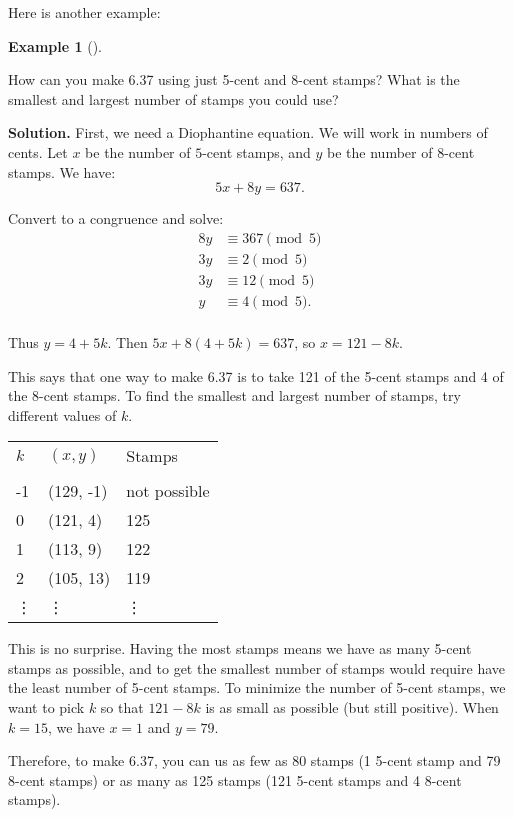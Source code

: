 \documentclass[10pt,]{book}
\theoremstyle{plain}
\theoremstyle{definition}
\newtheorem{example}[theorem]{Example}
\theoremstyle{definition}
\theoremstyle{definition}
\numberwithin{equation}{chapter}
\newcommand{\hrulethin}  {\noalign{\hrule height 0.04em}}
\newcommand{\amp}{ & }
\begin{document}
Here is another example:
%
\begin{example}[]\label{example-121}

How can you make \textdollar{}6.37 using just 5-cent and 8-cent stamps? What is the smallest and largest number of stamps you could use?
%
\par\medskip\noindent%
\textbf{Solution.}\quad
First, we need a Diophantine equation. We will work in numbers of cents. Let \(x\) be the number of \(5\)-cent stamps, and \(y\) be the number of 8-cent stamps. We have:
\begin{equation*}
  5x + 8y = 637.
\end{equation*}
%
\par

Convert to a congruence and solve:
\begin{equation*}
  \begin{aligned}8y \amp  \equiv 367 \pmod{5}\\
				3y \amp  \equiv 2 \pmod 5\\
				3y \amp  \equiv 12 \pmod 5\\
				y \amp  \equiv 4 \pmod 5.\\
\end{aligned}
\end{equation*}
%
\par

Thus \(y = 4 + 5k\). Then \(5x + 8(4+5k) = 637\), so \(x = 121 - 8k\).
%
\par

This says that one way to make \textdollar{}6.37 is to take 121 of the 5-cent stamps and 4 of the 8-cent stamps. To find the smallest and largest number of stamps, try different values of \(k\).
%
\begin{tabular}{lll}
\(k\)&\((x,y)\)&Stamps\tabularnewline[0pt]
&&\tabularnewline\hrulethin
-1&(129, -1)&not possible\tabularnewline[0pt]
0&(121, 4)&125\tabularnewline[0pt]
1&(113, 9)&122\tabularnewline[0pt]
2&(105, 13)&119\tabularnewline[0pt]
\vdots&\vdots&\vdots
\end{tabular}
\par

This is no surprise. Having the most stamps means we have as many 5-cent stamps as possible, and to get the smallest number of stamps would require have the least number of 5-cent stamps. To minimize the number of 5-cent stamps, we want to pick \(k\) so that \(121-8k\) is as small as possible (but still positive). When \(k = 15\), we have \(x = 1\) and \(y = 79\).
%
\par

Therefore, to make \textdollar{}6.37, you can us as few as 80 stamps (1 5-cent stamp and 79 8-cent stamps) or as many as 125 stamps (121 5-cent stamps and 4 8-cent stamps).
%
\end{example}
\par
\end{document}
